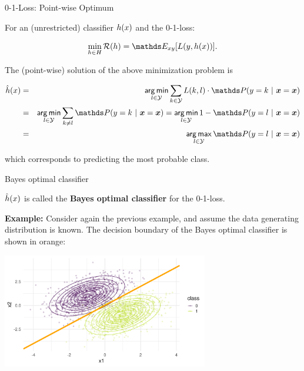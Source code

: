 \begin{vbframe}{0-1-Loss: Point-wise Optimum}

For an (unrestricted) classifier $h(x)$ and the 0-1-loss: 

$$
\min_{h \in \Hspace} \risk(h) = \E_{xy}[L(y, \hx)]. 
$$

The (point-wise) solution of the above minimization problem is

\begin{footnotesize}
  \begin{eqnarray*}  
  \hxh &=& \argmin_{l \in \Yspace} \sum_{k \in \Yspace} L(k, l) \cdot \P(y = k~|~\xv = \xv) \\
  &=& \argmin_{l \in \Yspace} \sum_{k \ne l} \P(y = k~|~\xv = \xv) = \argmin_{l \in \Yspace} 1 - \P(y = l~|~\xv = \xv) \\
  &=& \argmax_{l \in \Yspace} \P(y = l~|~ \xv = \xv)
  \end{eqnarray*}
\end{footnotesize}

which corresponds to predicting the most probable class. 

\end{vbframe}


\begin{vbframe}{Bayes optimal classifier}

$\hat{h}(x)$ is called the \textbf{Bayes optimal classifier} for the 0-1-loss. 

\lz

\textbf{Example: } Consider again the previous example, and assume the data generating distribution is known. The decision boundary of the Bayes optimal classifier is shown in orange: 

\begin{center}
\includegraphics[width = 9cm ]{figure_man/bayes_error_3.png} \\
\end{center}


\end{vbframe}


